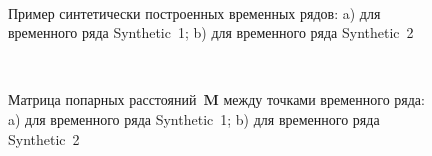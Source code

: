 \begin{figure}[h!t]\center
{}
\\
\caption{Пример синтетически построенных временных рядов: a) для временного ряда Synthetic~1; b) для временного ряда Synthetic~2}
\label{fig_synthetic_series}
\end{figure}

\begin{figure}[h!t]\center
{}
\\
\caption{Матрица попарных расстояний~$\textbf{M}$ между точками временного ряда: a) для временного ряда Synthetic~1; b) для временного ряда Synthetic~2}
\label{fig_synthetic_distance}
\end{figure}

